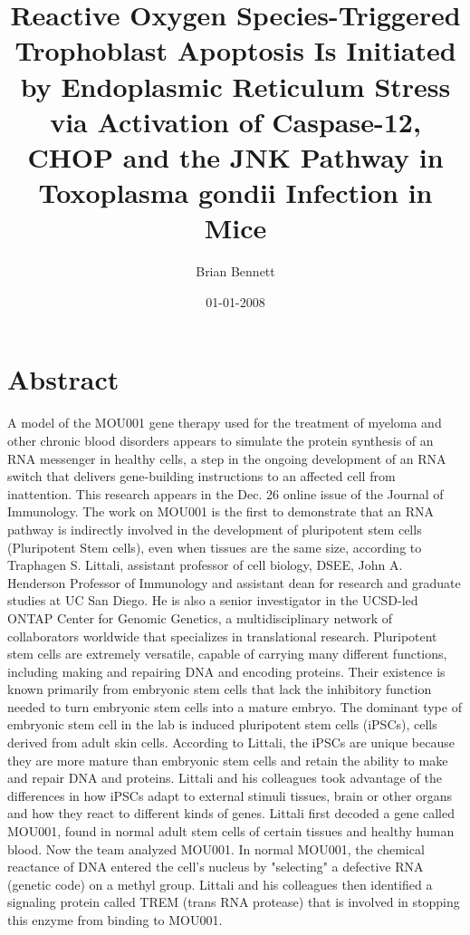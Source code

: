 \documentclass{article}%
\title{Reactive Oxygen Species{-}Triggered Trophoblast Apoptosis Is Initiated by Endoplasmic Reticulum Stress via Activation of Caspase{-}12, CHOP and the JNK Pathway in Toxoplasma gondii Infection in Mice}%
\author{Brian Bennett}%
\affil{Department of Animal and Poultry Sciences, Virginia Tech, Blacksburg, Virginia, United States of America}%
\date{01{-}01{-}2008}%
\begin{document}
%
\normalsize%
\maketitle%
\section{Abstract}%
\label{sec:Abstract}%
A model of the MOU001 gene therapy used for the treatment of myeloma and other chronic blood disorders appears to simulate the protein synthesis of an RNA messenger in healthy cells, a step in the ongoing development of an RNA switch that delivers gene{-}building instructions to an affected cell from inattention. This research appears in the Dec. 26 online issue of the Journal of Immunology.\newline%
The work on MOU001 is the first to demonstrate that an RNA pathway is indirectly involved in the development of pluripotent stem cells (Pluripotent Stem cells), even when tissues are the same size, according to Traphagen S. Littali, assistant professor of cell biology, DSEE, John A. Henderson Professor of Immunology and assistant dean for research and graduate studies at UC San Diego. He is also a senior investigator in the UCSD{-}led ONTAP Center for Genomic Genetics, a multidisciplinary network of collaborators worldwide that specializes in translational research.\newline%
Pluripotent stem cells are extremely versatile, capable of carrying many different functions, including making and repairing DNA and encoding proteins. Their existence is known primarily from embryonic stem cells that lack the inhibitory function needed to turn embryonic stem cells into a mature embryo.\newline%
The dominant type of embryonic stem cell in the lab is induced pluripotent stem cells (iPSCs), cells derived from adult skin cells. According to Littali, the iPSCs are unique because they are more mature than embryonic stem cells and retain the ability to make and repair DNA and proteins.\newline%
Littali and his colleagues took advantage of the differences in how iPSCs adapt to external stimuli  tissues, brain or other organs  and how they react to different kinds of genes.\newline%
Littali first decoded a gene called MOU001, found in normal adult stem cells of certain tissues and healthy human blood. Now the team analyzed MOU001.\newline%
In normal MOU001, the chemical reactance of DNA entered the cell's nucleus by "selecting" a defective RNA (genetic code) on a methyl group. Littali and his colleagues then identified a signaling protein called TREM (trans RNA protease) that is involved in stopping this enzyme from binding to MOU001.\newline%
\end{document}
